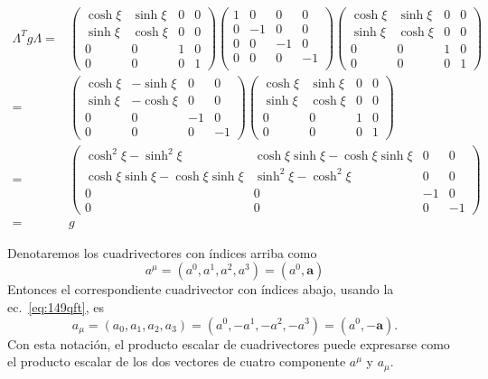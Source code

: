 \begin{align}
  \Lambda^T g \Lambda=&\begin{pmatrix}
    \cosh\xi&\sinh\xi&0&0\\
    \sinh\xi&\cosh\xi&0&0\\
    0     &  0  &1&0\\
    0     &  0  &0&1
  \end{pmatrix}
  \begin{pmatrix}
    1 & 0  & 0 &0\\
    0 & -1 & 0 &0\\
    0 & 0  & -1&0\\
    0 & 0  & 0 &-1\\
  \end{pmatrix}
  \begin{pmatrix}
    \cosh\xi&\sinh\xi&0&0\\
    \sinh\xi&\cosh\xi&0&0\\
    0     &  0  &1&0\\
    0     &  0  &0&1
  \end{pmatrix}\nonumber\\
  =&\begin{pmatrix}
       \cosh\xi&-\sinh\xi&0&0\\
    \sinh\xi&-\cosh\xi&0&0\\
    0     &  0  &-1&0\\
    0     &  0  &0&-1
  \end{pmatrix}
 \begin{pmatrix}
    \cosh\xi&\sinh\xi&0&0\\
    \sinh\xi&\cosh\xi&0&0\\
    0     &  0  &1&0\\
    0     &  0  &0&1
  \end{pmatrix}\nonumber\\
  =&\begin{pmatrix}
       \cosh^2\xi-\sinh^2\xi&\cosh\xi\sinh\xi-\cosh\xi\sinh\xi&0&0\\
    \cosh\xi\sinh\xi-\cosh\xi\sinh\xi&\sinh^2\xi-\cosh^2\xi&0&0\\
    0     &  0  &-1&0\\
    0     &  0  &0&-1
  \end{pmatrix}\nonumber\\
=&g
\end{align}

Denotaremos los cuadrivectores con índices arriba como
\begin{equation}
  \label{eq:upindx}
  a^\mu=(a^0,a^1,a^2,a^3)=(a^0,\mathbf{a})
\end{equation}
Entonces el correspondiente cuadrivector con índices abajo, usando la ec.~\eqref{eq:149qft}, es
\begin{equation}
  a_\mu=(a_0,a_1,a_2,a_3)=(a^0,-a^1,-a^2,-a^3)=(a^0,-\mathbf{a}).
\end{equation}
Con esta notación, el producto escalar de cuadrivectores puede expresarse como el producto escalar de los dos vectores de cuatro componente $a^\mu$ y $a_\mu$.
